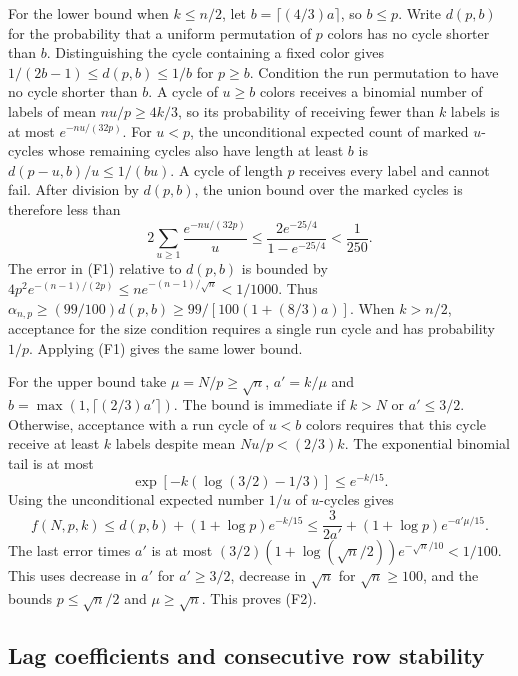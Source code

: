 For the lower bound when $k\le n/2$, let $b=\lceil (4/3)a\rceil$, so $b\le p$. Write $d(p,b)$ for the probability that a uniform permutation of $p$ colors has no cycle shorter than $b$. Distinguishing the cycle containing a fixed color gives $1/(2b-1)\le d(p,b)\le1/b$ for $p\ge b$. Condition the run permutation to have no cycle shorter than $b$. A cycle of $u\ge b$ colors receives a binomial number of labels of mean $nu/p\ge4k/3$, so its probability of receiving fewer than $k$ labels is at most $e^{-nu/(32p)}$. For $u<p$, the unconditional expected count of marked $u$-cycles whose remaining cycles also have length at least $b$ is $d(p-u,b)/u\le1/(bu)$. A cycle of length $p$ receives every label and cannot fail. After division by $d(p,b)$, the union bound over the marked cycles is therefore less than
\[
2\sum_{u\ge1} \frac{e^{-nu/(32p)}}{u}
\le \frac{2e^{-25/4}}{1-e^{-25/4}}<\frac1{250}.
\]
The error in (F1) relative to $d(p,b)$ is bounded by $4p^2 e^{-(n-1)/(2p)}\le n e^{-(n-1)/\sqrt n}<1/1000$. Thus $\alpha_{n,p}\ge(99/100)d(p,b)\ge99/[100(1+(8/3)a)]$. When $k>n/2$, acceptance for the size condition requires a single run cycle and has probability $1/p$. Applying (F1) gives the same lower bound.

For the upper bound take $\mu=N/p\ge\sqrt n$, $a'=k/\mu$ and $b=\max(1,\lceil (2/3)a'\rceil)$. The bound is immediate if $k>N$ or $a'\le3/2$. Otherwise, acceptance with a run cycle of $u<b$ colors requires that this cycle receive at least $k$ labels despite mean $Nu/p<(2/3)k$. The exponential binomial tail is at most
\[
\exp[-k(\log(3/2)-1/3)]\le e^{-k/15}.
\]
Using the unconditional expected number $1/u$ of $u$-cycles gives
\[
f(N,p,k)\le d(p,b)+(1+\log p)e^{-k/15}
\le\frac{3}{2a'}+(1+\log p)e^{-a'\mu/15}.
\]
The last error times $a'$ is at most $(3/2)(1+\log(\sqrt n/2))e^{-\sqrt n/10}<1/100$. This uses decrease in $a'$ for $a'\ge3/2$, decrease in $\sqrt n$ for $\sqrt n\ge100$, and the bounds $p\le\sqrt n/2$ and $\mu\ge\sqrt n$. This proves (F2).

\subsection{Lag coefficients and consecutive row stability}

